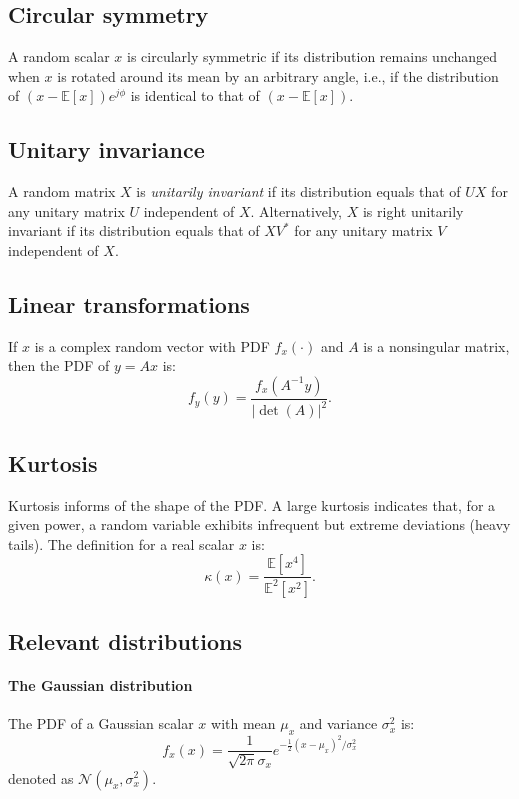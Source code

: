 \documentclass[a4paper, 12pt]{book}
\begin{document}
\subsection{Circular symmetry}
A random scalar $x$ is circularly symmetric if its distribution remains unchanged when $x$ is rotated around its mean by an arbitrary angle, i.e., if the distribution of $(x-\mathbb{E}[x])e^{j\phi}$ is identical to that of $(x-\mathbb{E}[x])$.

\subsection{Unitary invariance}
A random matrix $X$ is \textit{unitarily invariant} if its distribution equals that of $UX$ for any unitary matrix $U$ independent of $X$. Alternatively, $X$ is right unitarily invariant if its distribution equals that of $XV^{*}$ for any unitary matrix $V$ independent of $X$.

\subsection{Linear transformations}
If $x$ is a complex random vector with PDF $f_{x}(\cdot)$ and $A$ is a nonsingular matrix, then the PDF of $y=Ax$ is:
\begin{equation}
    f_{y}(y) = \frac{f_{x}(A^{-1}y)}{|\det(A)|^{2}}. \tag{C.11}
\end{equation}

\subsection{Kurtosis}
Kurtosis informs of the shape of the PDF. A large kurtosis indicates that, for a given power, a random variable exhibits infrequent but extreme deviations (heavy tails). The definition for a real scalar $x$ is:
\begin{equation}
    \kappa(x) = \frac{\mathbb{E}[x^4]}{\mathbb{E}^2[x^2]}. \tag{C.12}
\end{equation}

\subsection{Relevant distributions}

\paragraph{The Gaussian distribution}
The PDF of a Gaussian scalar $x$ with mean $\mu_{x}$ and variance $\sigma_{x}^{2}$ is:
\begin{equation}
    f_{x}(x) = \frac{1}{\sqrt{2\pi}\sigma_{x}}e^{-\frac{1}{2}(x-\mu_{x})^{2}/\sigma_{x}^{2}} \tag{C.13}
\end{equation}
denoted as $\mathcal{N}(\mu_{x}, \sigma_{x}^{2})$.
\end{document}
